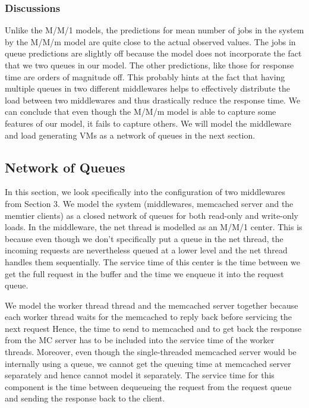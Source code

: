 \documentclass[11pt,a4paper]{article}
\newcommand\instructions[1]{\textcolor{blue}{Instructions: #1}}
\begin{document}
\subsubsection{Discussions}
Unlike the M/M/1 models, the predictions for mean number of jobs in the system by the M/M/m model are quite close to the actual observed values. The jobs in queue predictions are slightly off because the model does not incorporate the fact that we two queues in our model. The other predictions, like those for response time are orders of magnitude off. This probably hints at the fact that having multiple queues in two different middlewares helps to effectively distribute the load between two middlewares and thus drastically reduce the response time. We can conclude that even though the M/M/m model is able to capture some features of our model, it fails to capture others. We will model the middleware and load generating VMs as a network of queues in the next section.

\subsection{Network of Queues} 


In this section, we look specifically into the configuration of two middlewares from Section 3. We model the system (middlewares, memcached server and the memtier clients) as a closed network of queues for both read-only and write-only loads. In the middleware, the net thread is modelled as an M/M/1 center. This is because even though we don't specifically put a queue in the net thread, the incoming requests are nevertheless queued at a lower level and the net thread handles them sequentially. The service time of this center is the time between we get the full request in the buffer and the time we enqueue it into the request queue. 

We model the worker thread thread and the memcached server together because each worker thread waits for the memcached to reply back before servicing the next request Hence, the time to send to memcached and to get back the response from the MC server has to be included into the service time of the worker threads. Moreover, even though the single-threaded memcached server would be internally using a queue, we cannot get the queuing time at memcached server separately and hence cannot model it separately. The service time for this component is the time between dequeueing the request from the request queue and sending the response back to the client.
\end{document}
